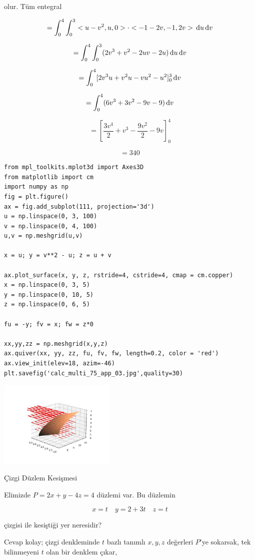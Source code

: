 \documentclass[12pt,fleqn]{article}\usepackage{../../common}
\begin{document}
olur. Tüm entegral

$$
= \int _{0}^{4} \int _{0}^{3} < u-v^2, u, 0 >  \cdot < -1-2v, -1, 2v >
\,\mathrm{d} u \,\mathrm{d} v
$$

$$
= \int_{0}^{4} \int_{0}^{3} (2v^3 + v^2 -2uv -2u )
\,\mathrm{d} u \,\mathrm{d} v
$$

$$
= \int_{0}^{4} [ 2v^3u + v^2u - vu^2 - u^2 ]_{0}^{3} \,\mathrm{d} v
$$

$$
= \int_{0}^{4} (6v^3 + 3v^2 - 9v -9 ) \,\mathrm{d} v
$$

$$
= \left[ \frac{3v^4}{2} + v^3 - \frac{9v^2}{2} - 9v \right]_{0}^{4}
$$

$$
= 340
$$

\begin{verbatim}
from mpl_toolkits.mplot3d import Axes3D
from matplotlib import cm
import numpy as np
fig = plt.figure()
ax = fig.add_subplot(111, projection='3d')
u = np.linspace(0, 3, 100)
v = np.linspace(0, 4, 100)
u,v = np.meshgrid(u,v)

x = u; y = v**2 - u; z = u + v

ax.plot_surface(x, y, z, rstride=4, cstride=4, cmap = cm.copper)
x = np.linspace(0, 3, 5)
y = np.linspace(0, 10, 5)
z = np.linspace(0, 6, 5)

fu = -y; fv = x; fw = z*0

xx,yy,zz = np.meshgrid(x,y,z)
ax.quiver(xx, yy, zz, fu, fv, fw, length=0.2, color = 'red')
ax.view_init(elev=18, azim=-46)
plt.savefig('calc_multi_75_app_03.jpg',quality=30)
\end{verbatim}

\includegraphics[width=15em]{calc_multi_75_app_03.jpg}

Çizgi Düzlem Kesişmesi

Elimizde $P = 2x + y - 4z = 4$ düzlemi var. Bu düzlemin 

$$ x = t \quad y = 2 + 3t \quad z = t$$

çizgisi ile kesiştiği yer neresidir? 

Cevap kolay; çizgi denkleminde $t$ bazlı tanımlı $x,y,z$ değerleri $P$'ye
sokarsak, tek bilinmeyeni $t$ olan bir denklem çıkar, 
\end{document}
